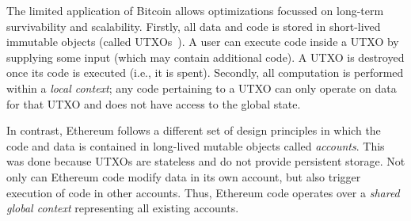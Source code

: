 \documentclass[runningheads]{llncs}
\newcommand{\ignore}[1]{}
\begin{document}
\ignore{
A useful way of representing a smart contract platform is to consider it as a {\em singleton computer}, where only one single-threaded instance exists in the entire world and everyone can use it for storage and computation by writing code in a language that the computer understands.
Bitcoin's language supports limited types of smart contracts, since its primary design goal was for a currency system. In this way, can think of Bitcoin as an {\em application specific} singleton computer, while Ethereum can be considered a {\em general purpose} singleton computer.
}

The limited application of Bitcoin allows optimizations focussed on long-term survivability and scalability. Firstly, all data and code is stored in short-lived immutable objects (called UTXOs~\cite{utxo}). A user can execute code inside a UTXO by supplying some input (which may contain additional code). A UTXO is destroyed once its code is executed (i.e., it is spent). Secondly, all computation is performed within a {\em local context}; any code pertaining to a UTXO can only operate on data for that UTXO and does not have access to the global state. 

In contrast, Ethereum follows a different set of design principles in which the code and data is contained in long-lived mutable objects called {\em accounts}. This was done because UTXOs are stateless and do not provide persistent storage. 
Not only can Ethereum code modify data in its own account, but also trigger execution of code in other accounts. Thus, Ethereum code operates over a {\em shared global context} representing all existing accounts. 

\end{document}
